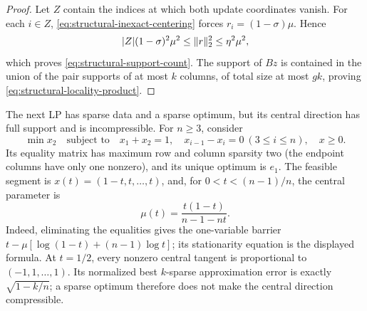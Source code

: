 \begin{proof}
Let $Z$ contain the indices at which both update coordinates vanish.  For
each $i\in Z$, \eqref{eq:structural-inexact-centering} forces
$r_i=(1-\sigma)\mu$.  Hence
\[
 |Z|(1-\sigma)^2\mu^2\leq\lVert r\rVert_2^2\leq\eta^2\mu^2,
\]
which proves \eqref{eq:structural-support-count}.  The support of $Bz$ is
contained in the union of the pair supports of at most $k$ columns, of total size at
most $gk$, proving \eqref{eq:structural-locality-product}.
\end{proof}

The next LP has sparse data and a sparse optimum, but its central
direction has full support and is incompressible.  For $n\geq3$, consider
\begin{equation}
 \min x_2\quad\text{subject to}\quad
 x_1+x_2=1,\quad x_{i-1}-x_i=0\ (3\leq i\leq n),\quad x\geq0.
                                                               \label{eq:structural-incompressible-lp}
\end{equation}
Its equality matrix has maximum row and column sparsity two (the endpoint
columns have only one nonzero), and its unique
optimum is $e_1$.  The feasible segment is
$x(t)=(1-t,t,\ldots,t)$, and, for $0<t<(n-1)/n$, the central parameter is
\begin{equation}
 \mu(t)=\frac{t(1-t)}{n-1-nt}.
\end{equation}
Indeed, eliminating the equalities gives the one-variable barrier
$t-\mu[\log(1-t)+(n-1)\log t]$; its stationarity equation is the displayed
formula.
At $t=1/2$, every nonzero central tangent is proportional to
$(-1,1,\ldots,1)$.  Its normalized best $k$-sparse approximation error is
exactly $\sqrt{1-k/n}$; a sparse optimum therefore does not make the central
direction compressible.

